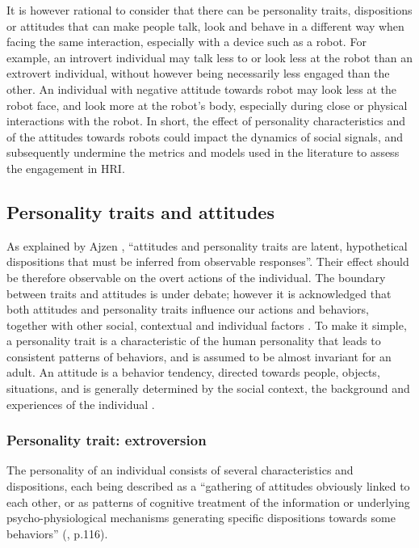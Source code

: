 It is however rational to consider that there can be personality traits, dispositions or attitudes that can make people talk, look and behave in a different way when facing the same interaction, especially with a device such as a robot.
For example, an introvert individual may talk less to or look less at the robot than an extrovert individual, without however being necessarily less engaged than the other. 
An individual with negative attitude towards robot may look less at the robot face, and look more at the robot's body, especially during close or physical interactions with the robot.
In short, the effect of  personality characteristics and of the attitudes towards robots could impact the dynamics of social signals, and subsequently undermine the metrics and models used in the literature to assess the engagement in HRI.


\subsection{Personality traits and attitudes}


As explained by Ajzen \cite{Ajzen1986}, ``attitudes and personality traits are latent, hypothetical dispositions that must be inferred from observable responses''. Their effect should be therefore observable on the overt actions of the individual.
The boundary between traits and attitudes is under debate; however it is acknowledged that both attitudes and personality traits influence our actions and behaviors, together with other social, contextual and individual factors \cite{Scherer1981}.
To make it simple, a personality trait is a characteristic of the human personality that leads to consistent patterns of behaviors, and is assumed to be almost invariant for an adult.
An attitude is a behavior tendency, directed towards people, objects, situations, and is generally determined by the social context, the background and experiences of the individual \cite{Wood2000}.



\subsubsection{Personality trait: extroversion}

The personality of an individual consists of several characteristics and dispositions, each  being described as a ``gathering of attitudes obviously linked to each other, or as patterns of cognitive treatment of the information or underlying psycho-physiological mechanisms generating specific dispositions towards some behaviors'' (\cite{Scherer1981}, p.116).

